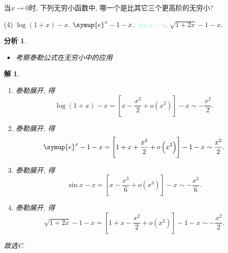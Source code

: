 \documentclass[a4paper, 12pt]{ctexart}
\theoremstyle{plain}
\theoremstyle{nonumberplain}
\newtheorem{solution}{解}
\theoremstyle{nonumberplain}
\newtheorem{analysis}{分析}
\theoremstyle{nonumberplain}
\newcommand{\ans}[1]{\textcolor{Aquamarine}{#1}}
\newcommand{\me}{\symup{e}}
\begin{document}
    \begin{problem}
        当$x\to 0$时, 下列无穷小函数中, 哪一个是比其它三个更高阶的无穷小?
        \begin{tasks}(4)
            \task $\log(1+x)-x$.
            \task $\me^x-1-x$.
            \task[\ans{(C)}] \ans{$\sin x-x$}.
            \task $\sqrt{1+2x}-1-x$.
        \end{tasks}
    \end{problem}
    \begin{analysis}
        \begin{itemize}
            \item 考察泰勒公式在无穷小中的应用
        \end{itemize}
    \end{analysis}
    \begin{solution}\hspace{\fill}
        \begin{enumerate}[\hspace{2em}A:]
            \item 泰勒展开, 得
            \begin{equation}
                \log(1+x)-x=\left[x-\frac{x^2}{2}+o\left(x^2\right)\right]-x\sim -\frac{x^2}{2}.
            \end{equation}
            \item 泰勒展开, 得
            \begin{equation}
                \me^x-1-x = \left[1+x+\frac{x^2}{2}+o\left(x^2\right)\right]-1-x\sim \frac{x^2}{2}.
            \end{equation}
            \item 泰勒展开, 得
            \begin{equation}
                \sin x-x = \left[x-\frac{x^3}{6}+o\left(x^3\right)\right]-x\sim -\frac{x^3}{6}.
            \end{equation}
            \item 泰勒展开, 得
            \begin{equation}
                \sqrt{1+2x}-1-x= \left[1+x-\frac{x^2}{2}+o\left(x^2\right)\right]-1-x\sim -\frac{x^2}{2}.
            \end{equation}
        \end{enumerate}
        故选C.
    \end{solution}
\end{document}
